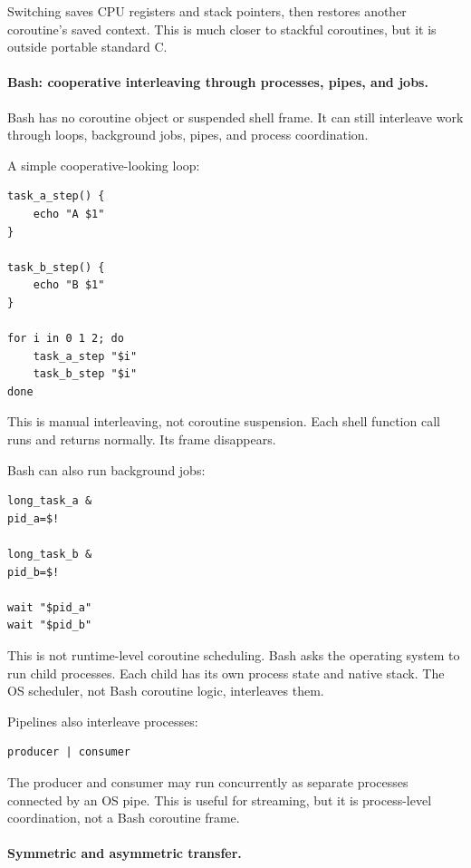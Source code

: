 Switching saves CPU registers and stack pointers, then restores another coroutine's saved context. This is much closer to stackful coroutines, but it is outside portable standard C.

\paragraph{Bash: cooperative interleaving through processes, pipes, and jobs.}

Bash has no coroutine object or suspended shell frame. It can still interleave work through loops, background jobs, pipes, and process coordination.

A simple cooperative-looking loop:

\begin{verbatim}
task_a_step() {
    echo "A $1"
}

task_b_step() {
    echo "B $1"
}

for i in 0 1 2; do
    task_a_step "$i"
    task_b_step "$i"
done
\end{verbatim}

This is manual interleaving, not coroutine suspension. Each shell function call runs and returns normally. Its frame disappears.

Bash can also run background jobs:

\begin{verbatim}
long_task_a &
pid_a=$!

long_task_b &
pid_b=$!

wait "$pid_a"
wait "$pid_b"
\end{verbatim}

This is not runtime-level coroutine scheduling. Bash asks the operating system to run child processes. Each child has its own process state and native stack. The OS scheduler, not Bash coroutine logic, interleaves them.

Pipelines also interleave processes:

\begin{verbatim}
producer | consumer
\end{verbatim}

The producer and consumer may run concurrently as separate processes connected by an OS pipe. This is useful for streaming, but it is process-level coordination, not a Bash coroutine frame.

\paragraph{Symmetric and asymmetric transfer.}

